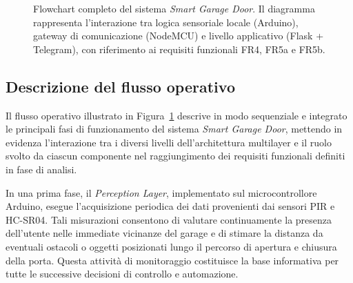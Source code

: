 \begin{figure}[H]

\caption{Flowchart completo del sistema \textit{Smart Garage Door}. Il diagramma rappresenta l'interazione tra logica sensoriale locale (Arduino), gateway di comunicazione (NodeMCU) e livello applicativo (Flask + Telegram), con riferimento ai requisiti funzionali FR4, FR5a e FR5b.}
\label{fig:flowchart_sgd}
\end{figure}

\subsection{Descrizione del flusso operativo}

Il flusso operativo illustrato in Figura~\ref{fig:flowchart_sgd} descrive in modo
sequenziale e integrato le principali fasi di funzionamento del sistema
\textit{Smart Garage Door}, mettendo in evidenza l’interazione tra i diversi
livelli dell’architettura multilayer e il ruolo svolto da ciascun componente nel
raggiungimento dei requisiti funzionali definiti in fase di analisi.

In una prima fase, il \textit{Perception Layer}, implementato sul
microcontrollore Arduino, esegue l’acquisizione periodica dei dati provenienti
dai sensori PIR e HC-SR04. Tali misurazioni consentono di valutare
continuamente la presenza dell’utente nelle immediate vicinanze del garage e
di stimare la distanza da eventuali ostacoli o oggetti posizionati lungo il
percorso di apertura e chiusura della porta. Questa attività di monitoraggio
costituisce la base informativa per tutte le successive decisioni di controllo
e automazione.

